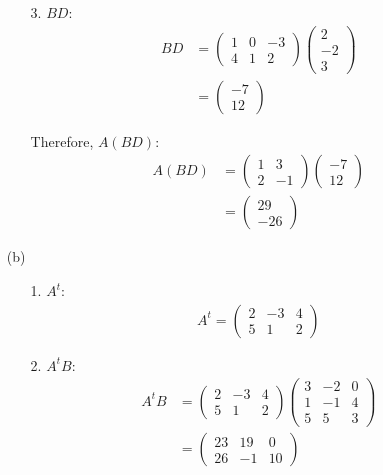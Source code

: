 \documentclass{article}
\begin{document}
\begin{enumerate}
\begin{enumerate}
\item[3.] $BD$:
\begin{align*}
BD &= \begin{pmatrix} 1 & 0 & -3 \\ 4 & 1 & 2 \end{pmatrix} \begin{pmatrix} 2 \\ -2 \\ 3 \end{pmatrix} \\
&= \begin{pmatrix} -7 \\ 12 \end{pmatrix}
\end{align*}

Therefore, $A(BD)$:
\begin{align*}
A(BD) &= \begin{pmatrix} 1 & 3 \\ 2 & -1 \end{pmatrix} \begin{pmatrix} -7 \\ 12 \end{pmatrix} \\
&= \begin{pmatrix} 29 \\ -26 \end{pmatrix}
\end{align*}
\end{enumerate}

\item[(b)]

\begin{enumerate}
\item[1.] $A^t$:
\begin{align*}
A^t = \begin{pmatrix} 2 & -3 & 4 \\ 5 & 1 & 2 \end{pmatrix}
\end{align*}

\item[2.] $A^tB$:
\begin{align*}
A^tB &= \begin{pmatrix} 2 & -3 & 4 \\ 5 & 1 & 2 \end{pmatrix} \begin{pmatrix} 3 & -2 & 0 \\ 1 & -1 & 4 \\ 5 & 5 & 3 \end{pmatrix} \\
&= \begin{pmatrix} 23 & 19 & 0 \\ 26 & -1 & 10 \end{pmatrix}
\end{align*}


\end{enumerate}
\end{enumerate}
\end{document}
